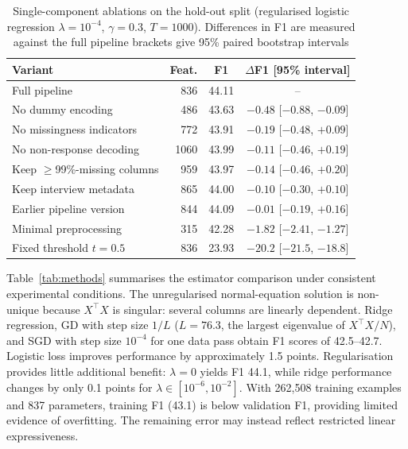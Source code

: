 \documentclass[10pt,conference]{IEEEtran}
\begin{document}
\begin{table}[tbp]
\centering
\caption{Single-component ablations on the hold-out split
(regularised logistic regression $\lambda=10^{-4}$, $\gamma=0.3$,
$T=1000$). Differences in F1 are measured against the full pipeline
brackets give 95\% paired bootstrap intervals}
\label{tab:ablation}
\footnotesize
\setlength{\tabcolsep}{4pt}
\begin{tabular}{@{}lrcc@{}}
\toprule
Variant & Feat. & F1 & $\Delta$F1 [95\% interval]\\
\midrule
Full pipeline                    & 836  & 44.11 & --\\
No dummy encoding                & 486  & 43.63 & $-0.48$ [$-0.88$, $-0.09$]\\
No missingness indicators        & 772  & 43.91 & $-0.19$ [$-0.48$, $+0.09$]\\
No non-response decoding         & 1060 & 43.99 & $-0.11$ [$-0.46$, $+0.19$]\\
Keep $\ge$99\%-missing columns   & 959  & 43.97 & $-0.14$ [$-0.46$, $+0.20$]\\
Keep interview metadata          & 865  & 44.00 & $-0.10$ [$-0.30$, $+0.10$]\\
Earlier pipeline version         & 844  & 44.09 & $-0.01$ [$-0.19$, $+0.16$]\\
Minimal preprocessing            & 315  & 42.28 & $-1.82$ [$-2.41$, $-1.27$]\\
Fixed threshold $t=0.5$          & 836  & 23.93 & $-20.2$ [$-21.5$, $-18.8$]\\
\bottomrule
\end{tabular}
\end{table}

Table~\ref{tab:methods} summarises the estimator comparison under consistent experimental conditions. The
unregularised normal-equation solution is non-unique because
$X^\top X$ is singular: several columns are linearly dependent. Ridge
regression, GD with step size $1/L$ ($L=76.3$, the largest eigenvalue
of $X^\top X/N$), and SGD with step size $10^{-4}$ for one data pass
obtain F1 scores of 42.5--42.7. Logistic loss improves performance by
approximately 1.5 points. Regularisation provides little additional
benefit: $\lambda=0$ yields F1 44.1, while ridge performance changes
by only 0.1 points for $\lambda\in[10^{-6},10^{-2}]$.
With 262{,}508 training examples and 837 parameters, training F1 (43.1)
is below validation F1, providing limited evidence of overfitting.
The remaining error may instead reflect restricted linear expressiveness.
\end{document}
